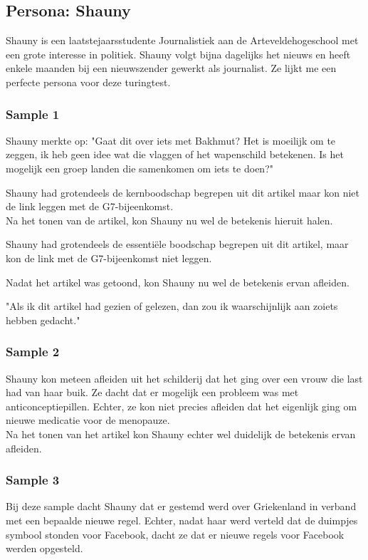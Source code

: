 \subsection{Persona: Shauny}
Shauny is een laatstejaarsstudente Journalistiek aan de Arteveldehogeschool met een grote interesse in politiek. Shauny volgt bijna dagelijks het nieuws en heeft enkele maanden bij een nieuwszender gewerkt als journalist. Ze lijkt me een perfecte persona voor deze turingtest.

\subsubsection{Sample 1}
Shauny merkte op: "Gaat dit over iets met Bakhmut? Het is moeilijk om te zeggen, ik heb geen idee wat die vlaggen of het wapenschild betekenen. Is het mogelijk een groep landen die samenkomen om iets te doen?" 

Shauny had grotendeels de kernboodschap begrepen uit dit artikel maar kon niet de link leggen met de G7-bijeenkomst.  \\

Na het tonen van de artikel, kon Shauny nu wel de betekenis hieruit halen. 

Shauny had grotendeels de essentiële boodschap begrepen uit dit artikel, maar kon de link met de G7-bijeenkomst niet leggen.

Nadat het artikel was getoond, kon Shauny nu wel de betekenis ervan afleiden.

"Als ik dit artikel had gezien of gelezen, dan zou ik waarschijnlijk aan zoiets hebben gedacht."

\subsubsection{Sample 2}
Shauny kon meteen afleiden uit het schilderij dat het ging over een vrouw die last had van haar buik. Ze dacht dat er mogelijk een probleem was met anticonceptiepillen. Echter, ze kon niet precies afleiden dat het eigenlijk ging om nieuwe medicatie voor de menopauze.\\

Na het tonen van het artikel kon Shauny echter wel duidelijk de betekenis ervan afleiden.

\subsubsection{Sample 3}
Bij deze sample dacht Shauny dat er gestemd werd over Griekenland in verband met een bepaalde nieuwe regel. Echter, nadat haar werd verteld dat de duimpjes symbool stonden voor Facebook, dacht ze dat er nieuwe regels voor Facebook werden opgesteld. \\

